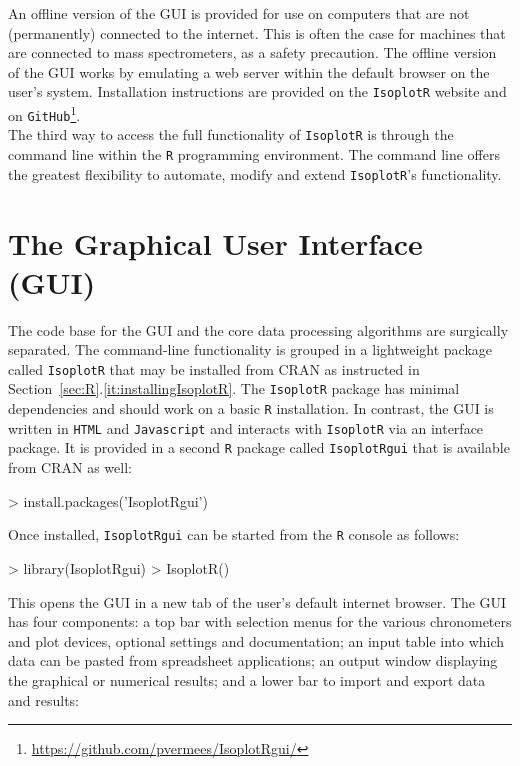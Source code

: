 \begin{refsection}
An offline version of the GUI is provided for use on computers that
are not (permanently) connected to the internet. This is often the
case for machines that are connected to mass spectrometers, as a
safety precaution. The offline version of the GUI works by emulating a
web server within the default browser on the user's
system. Installation instructions are provided on the
\texttt{IsoplotR} website and on
\texttt{GitHub}\footnote{\url{https://github.com/pvermees/IsoplotRgui/}}.\\

The third way to access the full functionality of \texttt{IsoplotR} is
through the command line within the \texttt{R} programming
environment. The command line offers the greatest flexibility to
automate, modify and extend \texttt{IsoplotR}'s functionality.

\section{The Graphical User Interface (GUI)}
\label{sec:GUI}

The code base for the GUI and the core data processing algorithms are
surgically separated. The command-line functionality is grouped in a
lightweight package called \texttt{IsoplotR} that may be installed
from CRAN as instructed in
Section~\ref{sec:R}.\ref{it:installingIsoplotR}. The \texttt{IsoplotR}
package has minimal dependencies and should work on a basic \texttt{R}
installation. In contrast, the GUI is written in \texttt{HTML} and
\texttt{Javascript} and interacts with \texttt{IsoplotR} via an
interface package. It is provided in a second \texttt{R} package
called \texttt{IsoplotRgui} that is available from CRAN as well:

\begin{console}
> install.packages('IsoplotRgui')
\end{console}

Once installed, \texttt{IsoplotRgui} can be started from the
\texttt{R} console as follows:

\begin{console}
> library(IsoplotRgui)
> IsoplotR()
\end{console}

This opens the GUI in a new tab of the user's default internet
browser.  The GUI has four components: a top bar with selection menus
for the various chronometers and plot devices, optional settings and
documentation; an input table into which data can be pasted from
spreadsheet applications; an output window displaying the graphical or
numerical results; and a lower bar to import and export data and
results:\\


\end{refsection}
